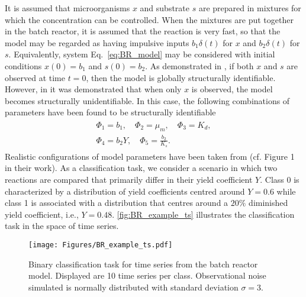 It is assumed that microorganisms $x$ and substrate $s$ are prepared in mixtures for which the concentration can be controlled. 
When the mixtures are put together in the batch reactor, it is assumed that the reaction is very fast, so that the model may be regarded as having impulsive inputs $b_{1}\delta(t)$ for $x$ and $b_{2}\delta(t)$ for $s$.
Equivalently, system Eq.~\eqref{eq:BR_model} may be considered with initial conditions $x(0)=b_{1}$ and $s(0)=b_{2}$.
As demonstrated in \cite{holmberg1982practical}, if both $x$ and $s$ are observed at time $t=0$, then the model is globally structurally identifiable.
However, in \cite{chappell1992structural, evans2000extensions} it was demonstrated that when only $x$ is observed, the model becomes structurally unidentifiable.
In this case, the following combinations of parameters have been found to be structurally identifiable
\begin{align}
    \begin{split}
        \Phi_{1} =  b_{1}, \quad \Phi_{2} =  \mu_{m}, \quad \Phi_{3} =  K_{d}, \\
        \Phi_{4} =  b_{2} Y, \quad \Phi_{5} =  \frac{b_{2}}{K_{s}}.
    \end{split}
\end{align}
Realistic configurations of model parameters have been taken from \cite{holmberg1982practical} (cf. Figure 1 in their work).
As a classification task, we consider a scenario in which two reactions are compared that primarily differ in their yield coefficient $Y$.
Class 0 is characterized by a distribution of yield coefficients centred around $Y=0.6$ while class 1 is associated with a distribution that centres around a $20\%$ diminished yield coefficient, i.e., $Y=0.48$.
\autoref{fig:BR_example_ts} illustrates the classification task in the space of time series.

\begin{figure}[t!]
    \centering
    \texttt{[image: Figures/BR\_example\_ts.pdf]}
    \caption{Binary classification task for time series from the batch reactor model. 
    Displayed are 10 time series per class.
    Observational noise simulated is normally distributed with standard deviation $\sigma = 3$.
    }
    \label{fig:BR_example_ts}
\end{figure}

